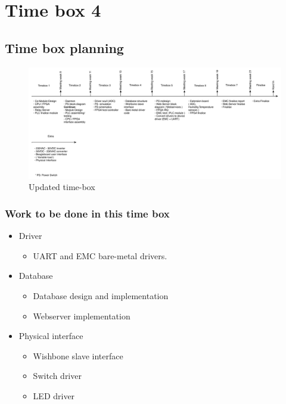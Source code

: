 \section{Time box 4}
\subsection{Time box planning}
\begin{figure}[H]
	\begin{centering}
		\includegraphics[width=1.0\textwidth]{content/appendix/eudp/images/tb_r4.pdf}
		\caption{Updated time-box}
	\end{centering}
\end{figure}
\subsubsection{Work to be done in this time box}
\begin{itemize}
	\item Driver
	\begin{itemize}
		\item UART and EMC bare-metal drivers.
	\end{itemize}
	\item Database
	\begin{itemize}
		\item Database design and implementation
		\item Webserver implementation
	\end{itemize}
	\item Physical interface
	\begin{itemize}
		\item Wishbone slave interface
		\item Switch driver
		\item LED driver
	\end{itemize}
\end{itemize}
